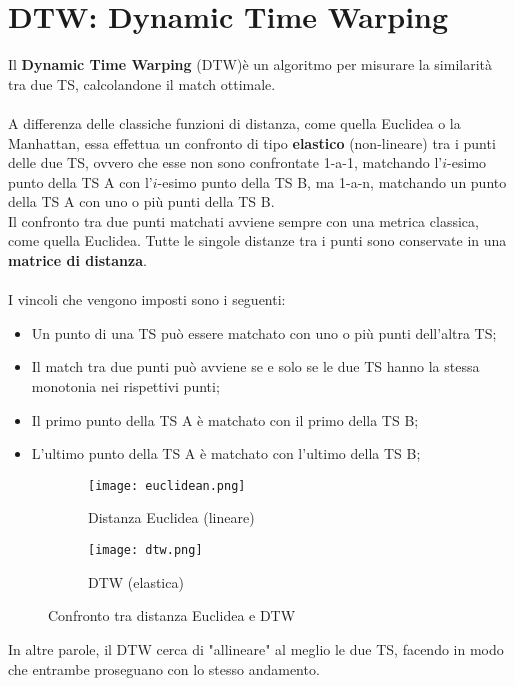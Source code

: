 \section{DTW: Dynamic Time Warping}
Il \textbf{Dynamic Time Warping} (DTW)\cite{dtw}è un algoritmo per misurare la similarità tra due TS, calcolandone il match ottimale.\\
\\
A differenza delle classiche funzioni di distanza, come quella Euclidea o la Manhattan, essa effettua un confronto di tipo \textbf{elastico} (non-lineare) tra i punti delle due TS, ovvero che esse non sono confrontate 1-a-1, matchando l'$i$-esimo punto della TS A con l'$i$-esimo punto della TS B, ma 1-a-n, matchando un punto della TS A con uno o più punti della TS B.\\
Il confronto tra due punti matchati avviene sempre con una metrica classica, come quella Euclidea. Tutte le singole distanze tra i punti sono conservate in una \textbf{matrice di distanza}.\\
\\
I vincoli che vengono imposti sono i seguenti:
\begin{itemize}
	\item Un punto di una TS può essere matchato con uno o più punti dell'altra TS;
	\item Il match tra due punti può avviene se e solo se le due TS hanno la stessa monotonia nei rispettivi punti;
	\item Il primo punto della TS A è matchato con il primo della TS B;
	\item L'ultimo punto della TS A è matchato con l'ultimo della TS B; 
\end{itemize}
\begin{figure}[H]
	\centering
	\begin{subfigure}{.5\textwidth}
		\centering
		\texttt{[image: euclidean.png]}
		\caption{Distanza Euclidea (lineare)}
		\label{fig:distance_euclidean}
	\end{subfigure}%
	\begin{subfigure}{.5\textwidth}
		\centering
		\texttt{[image: dtw.png]}
		\caption{DTW (elastica)}
		\label{fig:distance_dtw}
	\end{subfigure}
	\caption{Confronto tra distanza Euclidea e DTW}
	\label{fig:distance}
\end{figure}
In altre parole, il DTW cerca di "allineare" al meglio le due TS, facendo in modo che entrambe proseguano con lo stesso andamento.\\
